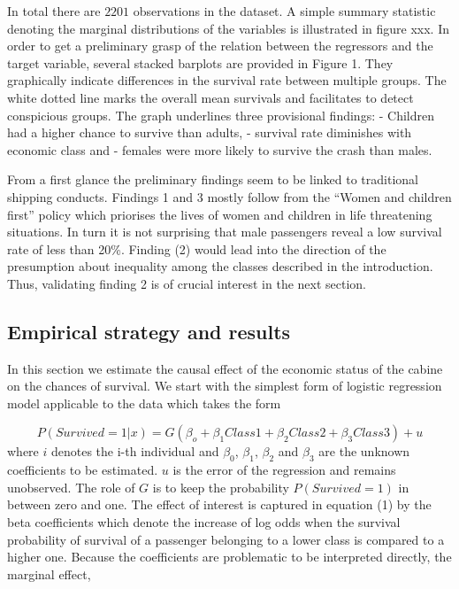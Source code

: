 \documentclass[
]{article}
\begin{document}
In total there are \(2201\) observations in the dataset. A simple
summary statistic denoting the marginal distributions of the variables
is illustrated in figure xxx. In order to get a preliminary grasp of the
relation between the regressors and the target variable, several stacked
barplots are provided in Figure 1. They graphically indicate differences
in the survival rate between multiple groups. The white dotted line
marks the overall mean survivals and facilitates to detect conspicious
groups. The graph underlines three provisional findings: - Children had
a higher chance to survive than adults, - survival rate diminishes with
economic class and - females were more likely to survive the crash than
males.

From a first glance the preliminary findings seem to be linked to
traditional shipping conducts. Findings 1 and 3 mostly follow from the
``Women and children first'' policy which priorises the lives of women
and children in life threatening situations. In turn it is not
surprising that male passengers reveal a low survival rate of less than
20\%. Finding (2) would lead into the direction of the presumption about
inequality among the classes described in the introduction. Thus,
validating finding 2 is of crucial interest in the next section.

\hypertarget{empirical-strategy-and-results}{%
\subsection{Empirical strategy and
results}\label{empirical-strategy-and-results}}

In this section we estimate the causal effect of the economic status of
the cabine on the chances of survival. We start with the simplest form
of logistic regression model applicable to the data which takes the form

\[P(Survived = 1|x)= G(\beta_o + \beta_1Class1 + \beta_2Class2 + \beta_3Class3) + u\]
where \(i\) denotes the i-th individual and \(\beta_0\), \(\beta_1\),
\(\beta_2\) and \(\beta_3\) are the unknown coefficients to be
estimated. \(u\) is the error of the regression and remains unobserved.
The role of \(G\) is to keep the probability \(P(Survived = 1)\) in
between zero and one. The effect of interest is captured in equation (1)
by the beta coefficients which denote the increase of log odds when the
survival probability of survival of a passenger belonging to a lower
class is compared to a higher one. Because the coefficients are
problematic to be interpreted directly, the marginal effect,
\end{document}
